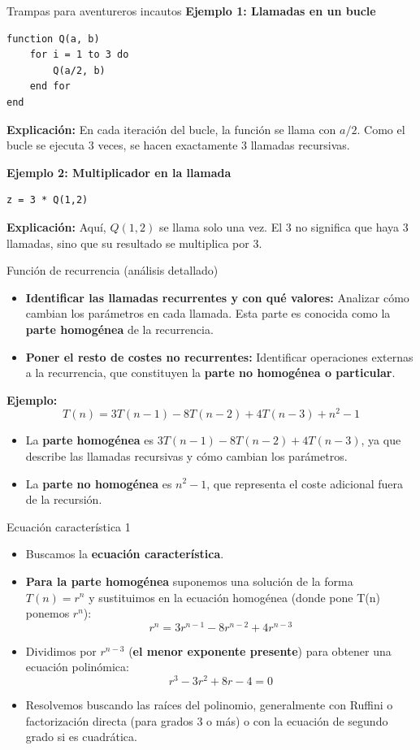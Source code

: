 \documentclass[aspectratio=169]{beamer}
\begin{document}
\begin{frame}[fragile]{Trampas para aventureros incautos}
\textbf{Ejemplo 1: Llamadas en un bucle}
\begin{lstlisting}
function Q(a, b)
    for i = 1 to 3 do
        Q(a/2, b)
    end for
end
\end{lstlisting}
\textbf{Explicación:} 
En cada iteración del bucle, la función se llama con $a/2$. Como el bucle se ejecuta 3 veces, se hacen exactamente 3 llamadas recursivas.

\textbf{Ejemplo 2: Multiplicador en la llamada}
\begin{lstlisting}
z = 3 * Q(1,2)
\end{lstlisting}
\textbf{Explicación:} 
Aquí, $Q(1,2)$ se llama solo una vez. El 3 no significa que haya 3 llamadas, sino que su resultado se multiplica por 3.
\end{frame}

\begin{frame}{Función de recurrencia (análisis detallado)}
\begin{itemize}
    \item \textbf{Identificar las llamadas recurrentes y con qué valores:} 
    Analizar cómo cambian los parámetros en cada llamada. Esta parte es conocida como la \textbf{parte homogénea} de la recurrencia.
    
    \item \textbf{Poner el resto de costes no recurrentes:} 
    Identificar operaciones externas a la recurrencia, que constituyen la \textbf{parte no homogénea o particular}.
\end{itemize}

\textbf{Ejemplo:}
\[
T(n) = 3T(n-1) - 8T(n-2) + 4T(n-3) + n^2 - 1
\]
\begin{itemize}
    \item La \textbf{parte homogénea} es \( 3T(n-1) - 8T(n-2) + 4T(n-3) \), ya que describe las llamadas recursivas y cómo cambian los parámetros.
    \item La \textbf{parte no homogénea} es \( n^2 - 1 \), que representa el coste adicional fuera de la recursión.
\end{itemize}
\end{frame}

\begin{frame}{Ecuación característica 1}
\begin{itemize}
    \item Buscamos la \textbf{ecuación característica}.
    \item \textbf{Para la parte homogénea} suponemos una solución de la forma \( T(n) = r^n \) y sustituimos en la ecuación homogénea (donde pone T(n) ponemos \( r^n\)):
    \[
    r^n = 3r^{n-1} - 8r^{n-2} + 4r^{n-3}
    \]
    \item Dividimos por \( r^{n-3} \) (\textbf{el menor exponente presente}) para obtener una ecuación polinómica:
    \[
    r^3 - 3r^2 + 8r - 4 = 0
    \]
    \item Resolvemos buscando las raíces del polinomio, generalmente con Ruffini o factorización directa (para grados 3 o más) o con la ecuación de segundo grado si es cuadrática.
\end{itemize}
\end{frame}
\end{document}
